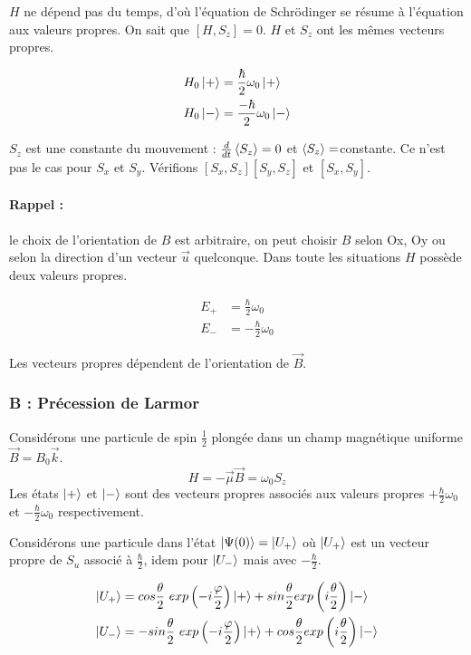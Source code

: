 \documentclass[12pt,a4paper,titlepage]{book}
\begin{document}
$H$ ne dépend pas du temps, d'où l'équation de Schrödinger se résume à l'équation aux valeurs propres. On sait que $[H,S_z] = 0$. $H$ et $S_z$ ont les mêmes vecteurs propres.

\begin{align*}
H_0 \ket+ &= \frac{\hbar}{2} \omega_0 \ket+ \\
H_0 \ket- &= \frac{-\hbar}{2} \omega_0 \ket-
\end{align*}

$S_z$ est une constante du mouvement : $\frac{d}{dt} \braket{S_z} = 0$ et $\braket{S_z} = $constante. Ce n'est pas le cas pour $S_x$ et $S_y$. Vérifions $[S_x, S_z] [S_y, S_z]$ et $[S_x, S_y]$.

\paragraph*{Rappel : }

le choix de l'orientation de $B$ est arbitraire, on peut choisir $B$ selon Ox, Oy ou selon la direction d'un vecteur $\overrightarrow{u}$ quelconque. Dans toute les situations $H$ possède deux valeurs propres.

\begin{align*}
E_+ &= \frac{\hbar}{2} \omega_0 \\
E_- &= -\frac{\hbar}{2} \omega_0
\end{align*}

Les vecteurs propres dépendent de l'orientation de $\overrightarrow{B}$.

\subsubsection{B : Précession de Larmor}

Considérons une particule de spin $\frac{1}{2}$ plongée dans un champ magnétique uniforme $\overrightarrow{B} = B_0 \overrightarrow{k}$.
\begin{equation*}
H = -\overrightarrow{\mu} \overrightarrow{B} = \omega_0 S_z
\end{equation*}
Les états $\ket+$ et $\ket-$ sont des vecteurs propres associés aux valeurs propres $+\frac{\hbar}{2} \omega_0$ et $-\frac{\hbar}{2} \omega_0$ respectivement.

Considérons une particule dans l'état $\ket{\Psi(0)} = \ket{U_+}$ où $\ket{U_+}$ est un vecteur propre de $S_u$ associé à $\frac{\hbar}{2}$, idem pour $\ket{U_-}$ mais avec $-\frac{\hbar}{2}$.

\begin{align*}
\ket{U_+} &= cos \frac{\theta}{2} ~exp \left(-i \frac{\varphi}{2} \right) \ket+ + sin \frac{\theta}{2} exp \left(i \frac{\theta}{2} \right) \ket- \\
\ket{U_-} &= -sin \frac{\theta}{2} ~exp \left(-i \frac{\varphi}{2} \right) \ket+ + cos \frac{\theta}{2} exp \left(i \frac{\theta}{2} \right) \ket-
\end{align*}
\end{document}
